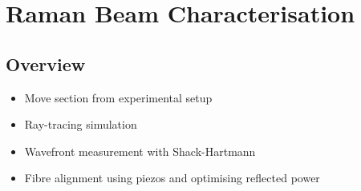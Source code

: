\chapter{Raman Beam Characterisation}
\label{chap:ramanbeam}
\section{Overview}
\begin{itemize}
    \item Move section from experimental setup 
    \item Ray-tracing simulation
    \item Wavefront measurement with Shack-Hartmann
    \item Fibre alignment using piezos and optimising reflected power  
\end{itemize}

\se